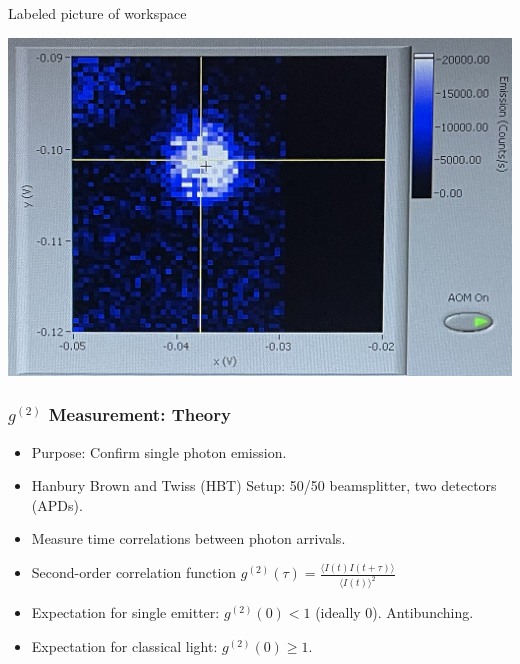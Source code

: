 \documentclass{beamer}
\begin{document}
\begin{frame}{Labeled picture of workspace}
    \begin{minipage}{0.48\textwidth}
        \centering
        \includegraphics[width=\linewidth]{presentation/figs/galvo.png}
        
    \end{minipage}
\end{frame}


\begin{frame}
\frametitle{$g^{(2)}$ Measurement: Theory}
\begin{itemize}
    \item Purpose: Confirm single photon emission.
    \item Hanbury Brown and Twiss (HBT) Setup: 50/50 beamsplitter, two detectors (APDs).
    \item Measure time correlations between photon arrivals.
    \item Second-order correlation function $g^{(2)}(\tau) = \frac{\langle I(t)I(t+\tau) \rangle}{\langle I(t) \rangle^2}$
    \item Expectation for single emitter: $g^{(2)}(0) < 1$ (ideally 0). Antibunching.
    \item Expectation for classical light: $g^{(2)}(0) \ge 1$.
\end{itemize}
\end{frame}
\end{document}
